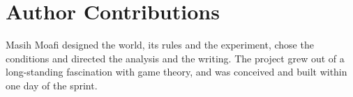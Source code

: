 \section*{Author Contributions}
Masih Moafi designed the world, its rules and the experiment, chose the conditions and
directed the analysis and the writing. The project grew out of a long-standing
fascination with game theory, and was conceived and built within one day of the sprint.
